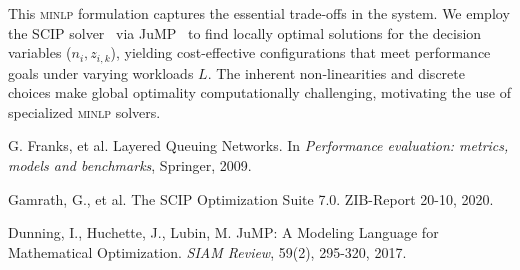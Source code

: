 \documentclass{article}
\newcommand{\minlp}{\textsc{minlp}}
\begin{document}
This \minlp{} formulation captures the essential trade-offs in the system. We employ the SCIP solver~\cite{scip} via JuMP~\cite{JuMP} to find locally optimal solutions for the decision variables (\(n_i, z_{i,k}\)), yielding cost-effective configurations that meet performance goals under varying workloads \(L\). The inherent non-linearities and discrete choices make global optimality computationally challenging, motivating the use of specialized \minlp{} solvers.

\begin{thebibliography}{9}
    G. Franks, et al. Layered Queuing Networks. In \emph{Performance evaluation: metrics, models and benchmarks}, Springer, 2009.

    Gamrath, G., et al. The SCIP Optimization Suite 7.0. ZIB-Report 20-10, 2020.

    Dunning, I., Huchette, J., Lubin, M. JuMP: A Modeling Language for Mathematical Optimization. \emph{SIAM Review}, 59(2), 295-320, 2017.
    
\end{thebibliography}
\end{document}

